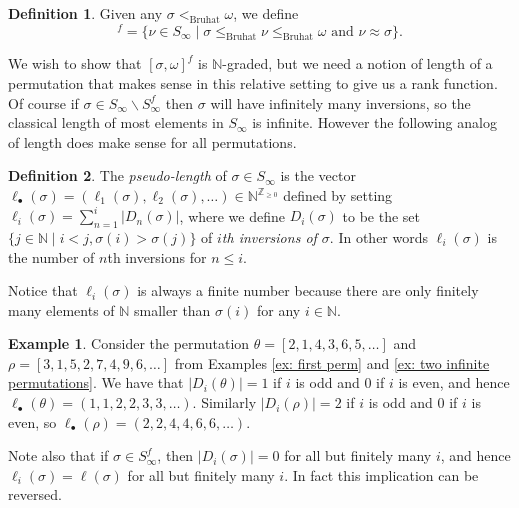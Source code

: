 \documentclass[oneside,11pt,reqno]{amsart}
\newcommand{\zz}{\ensuremath{\mathbb{Z}}}
\newcommand{\nn}{\ensuremath{\mathbb{N}}}
\theoremstyle{definition}
\newtheorem{definition}{Definition}
\newtheorem{example}{Example}
\newtheorem{proof techniques}{Proof Techniques}
\begin{document}
\begin{definition}
    Given any $\sigma <_\text{Bruhat} \omega$, we define 
\begin{equation*}
    [\sigma , \omega]^f = \{ \nu \in S_\infty \mid \sigma \leq_\text{Bruhat} \nu \leq_\text{Bruhat} \omega \text{ and } \nu \approx \sigma \}.
\end{equation*}
\end{definition}

We wish to show that $[\sigma , \omega]^f$ is $\nn$-graded, but we need a notion of length of a permutation that makes sense in this relative setting to give us a rank function. Of course if $\sigma \in S_\infty \smallsetminus S^f_\infty$ then $\sigma$ will have infinitely many inversions, so the classical length of most elements in $S_\infty$ is infinite. However the following analog of length does make sense for all permutations.

\begin{definition}
The \emph{pseudo-length} of $\sigma \in S_\infty$ is the vector $\ell_\bullet(\sigma) = (\ell_1(\sigma), \ell_2(\sigma), \ldots) \in \nn^{\zz_{\geq 0}}$ defined by setting $\ell_i(\sigma) = \sum_{n = 1}^i |D_n(\sigma)|$, where we define $D_i(\sigma)$ to be the set $\{ j \in \nn \mid i < j, \sigma(i) > \sigma(j) \}$ of \emph{$i$th inversions of $\sigma$}. In other words $\ell_{i}(\sigma)$ is the number of $n$th inversions for $n \leq i$. 
\end{definition}

Notice that $\ell_i(\sigma)$ is always a finite number because there are only finitely many elements of $\nn$ smaller than $\sigma(i)$ for any $i \in \nn$.

\begin{example}
Consider the permutation $\theta = [2 , 1 , 4 , 3 , 6 , 5 , \ldots]$ and $\rho = [3 , 1 , 5 , 2 , 7 , 4, 9 , 6 , \ldots ]$ from Examples \ref{ex: first perm} and \ref{ex: two infinite permutations}. We have that $|D_i(\theta)| = 1$ if $i$ is odd and $0$ if $i$ is even, and hence $\ell_\bullet(\theta) = (1, 1 , 2 , 2 , 3 , 3 , \ldots)$. Similarly $|D_i(\rho)| = 2$ if $i$ is odd and $0$ if $i$ is even, so $\ell_\bullet(\rho) = (2, 2 , 4 , 4 , 6 , 6 , \ldots)$. 
\end{example}

Note also that if $\sigma \in S_\infty^f$, then $|D_i(\sigma)| = 0$ for all but finitely many $i$, and hence $\ell_i(\sigma) = \ell(\sigma)$ for all but finitely many $i$. In fact this implication can be reversed.
\end{document}
